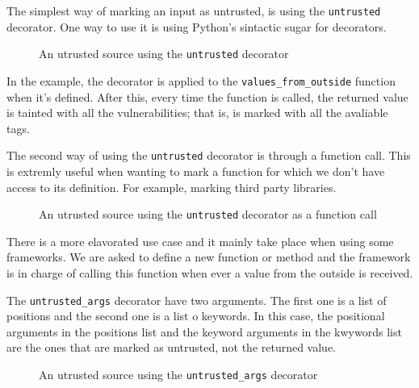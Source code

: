 The simplest way of marking an input as untrusted, is using the \texttt{untrusted} decorator.
One way to use it is using Python's sintactic sugar for decorators.

\begin{figure}[t]
{\small{
\begin{minipage}[t]{0.5\linewidth}
 
\end{minipage}
\caption{\label{fig:untrusted1}An utrusted source using the \texttt{untrusted} decorator}
}}
\end{figure}

In the example, the decorator is applied to the \texttt{values\_from\_outside} function
when it's defined. After this, every time the function is called, the returned value
is tainted with all the vulnerabilities; that is, is marked with all the avaliable tags.

The second way of using the \texttt{untrusted} decorator is through a function call.
This is extremly useful when wanting to mark a function for which we don't have access 
to its definition. For example, marking third party libraries.

\begin{figure}[t]
{\small{
\begin{minipage}[t]{0.5\linewidth}
 
\end{minipage}
\caption{\label{fig:untrusted2}An utrusted source using the \texttt{untrusted} decorator as a function call}
}}
\end{figure}

There is a more elavorated use case and it mainly take place when using some frameworks.
We are asked to define a new function or method and the framework is in charge of
calling this function when ever a value from the outside is received.

The \texttt{untrusted\_args} decorator have two arguments. The first one is a list 
of positions and the second one is a list o keywords. In this case, the
positional arguments in the positions list and the keyword arguments in the kwywords
list are the ones that are marked as untrusted, not the returned value.

\begin{figure}[t]
{\small{
\begin{minipage}[t]{0.5\linewidth}
 
\end{minipage}
\caption{\label{fig:untrusted_args}An utrusted source using the \texttt{untrusted\_args} decorator}
}}
\end{figure}


